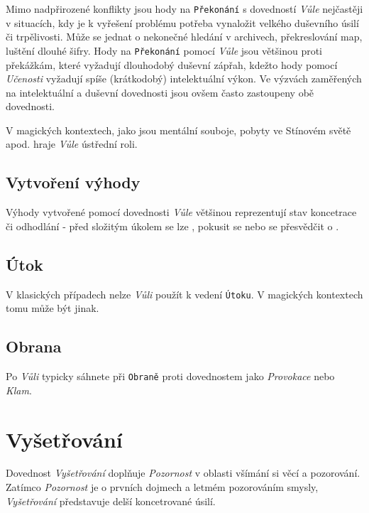 \documentclass[../main.tex]{subfiles}
\begin{document}
Mimo nadpřirozené konflikty jsou hody na \texttt{Překonání} s dovedností \textit{Vůle} nejčastěji v situacích, kdy je k vyřešení problému potřeba vynaložit velkého duševního úsilí či trpělivosti. Může se jednat o nekonečné hledání v archivech, překreslování map, luštění dlouhé šifry. Hody na \texttt{Překonání} pomocí \textit{Vůle} jsou většinou proti překážkám, které vyžadují dlouhodobý duševní zápřah, kdežto hody pomocí \textit{Učenosti} vyžadují spíše (krátkodobý) intelektuální výkon. Ve výzvách zaměřených na intelektuální a duševní dovednosti jsou ovšem často zastoupeny obě dovednosti.

V magických kontextech, jako jsou mentální souboje, pobyty ve Stínovém světě apod. hraje \textit{Vůle} ústřední roli.

\subsection*{Vytvoření výhody}
\label{subsec:vule-vytvoreni}
\vytvoreni

Výhody vytvořené pomocí dovednosti \textit{Vůle} většinou reprezentují stav koncetrace či odhodlání - před složitým úkolem se lze , pokusit se  nebo se přesvědčit o .

\subsection*{Útok}
\label{subsec:vule-utok}
\utok

V klasických případech nelze \textit{Vůli} použít k vedení \texttt{Útoku}. V magických kontextech tomu může být jinak.

\subsection*{Obrana}
\label{subsec:vule-obrana}
\obrana

Po \textit{Vůli} typicky sáhnete při \texttt{Obraně} proti dovednostem jako \textit{Provokace} nebo \textit{Klam}.

\section{Vyšetřování}
\label{sec:vysetrovani}

Dovednost \textit{Vyšetřování} doplňuje \textit{Pozornost} v oblasti všímání si věcí a pozorování. Zatímco \textit{Pozornost} je o prvních dojmech a letmém pozorováním smysly, \textit{Vyšetřování} představuje delší koncetrované úsilí.
\end{document}
